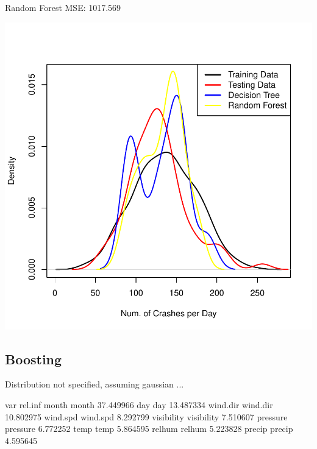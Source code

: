 \documentclass[11pt, a4paper]{article}
\begin{document}
\begin{Schunk}
\begin{Soutput}
Random Forest MSE: 1017.569
\end{Soutput}
\end{Schunk}
\includegraphics{regression-025}





\pagebreak
\subsection{Boosting}

\begin{Schunk}
\begin{Soutput}
Distribution not specified, assuming gaussian ...
\end{Soutput}
\begin{Soutput}
                  var   rel.inf
month           month 37.449966
day               day 13.487334
wind.dir     wind.dir 10.802975
wind.spd     wind.spd  8.292799
visibility visibility  7.510607
pressure     pressure  6.772252
temp             temp  5.864595
relhum         relhum  5.223828
precip         precip  4.595645
\end{Soutput}
\end{Schunk}
\end{document}
